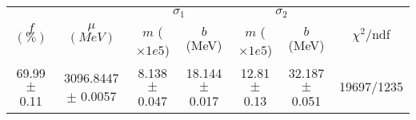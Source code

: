 \begin{tabular}{c|c|cc|cc||c}
 \multirow{2}{*}{$f$ $(\%)$} & \multirow{2}{*}{$\mu$ $(MeV)$} & \multicolumn{2}{|c|}{$\sigma_1$} & \multicolumn{2}{|c||}{$\sigma_2$} & \multirow{2}{*}{$\chi^2/$ndf} \\
 & & $m$ ($\times1e5$) & $b$ (MeV) & $m$ ($\times1e5$) & $b$ (MeV) & \\
\hline
69.99 $\pm$ 0.11 & 3096.8447 $\pm$ 0.0057 & 8.138 $\pm$ 0.047 & 18.144 $\pm$ 0.017 & 12.81 $\pm$ 0.13 & 32.187 $\pm$ 0.051 & 19697/1235\\
\end{tabular}
